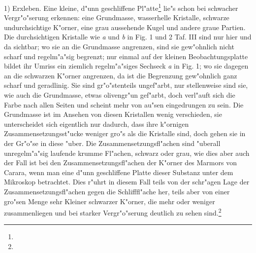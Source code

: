 \documentclass[a4paper, 11pt, oneside]{article}
\begin{document}
1) Erxleben. Eine kleine, d"unn geschliffene Pl"atte\footnote{} lie"s schon bei schwacher Vergr"o"serung erkennen: eine Grundmasse, wasserhelle Kristalle, schwarze undurchsichtige K"orner, eine grau aussehende Kugel und andere graue Partien. Die durchsichtigen Kristalle wie \emph{a} und \emph{b} in Fig. 1 und 2 Taf. III sind nur hier und da sichtbar; wo sie an die Grundmasse angrenzen, sind sie gew"ohnlich nicht scharf und regelm"a"sig begrenzt; nur einmal auf der kleinen Beobachtungsplatte bildet ihr Umriss ein ziemlich regelm"a"siges Sechseck \emph{a} in Fig. 1; wo sie dagegen an die schwarzen K"orner angrenzen, da ist die Begrenzung gew"ohnlich ganz scharf und geradlinig. Sie sind gr"o"stenteils ungef"arbt, nur stellenweise sind sie, wie auch die Grundmasse, etwas olivengr"un gef"arbt, doch verl"auft sich die Farbe nach allen Seiten und scheint mehr von au"sen eingedrungen zu sein. Die Grundmasse ist im Ansehen von diesen Kristallen wenig verschieden, sie unterscheidet sich eigentlich nur dadurch, dass ihre k"ornigen Zusammensetzungsst"ucke weniger gro"s als die Kristalle sind, doch gehen sie in der Gr"o"se in diese "uber. Die Zusammensetzungsfl"achen sind "uberall unregelm"a"sig laufende krumme Fl"achen, schwarz oder grau, wie dies aber auch der Fall ist bei den Zusammensetzungsfl"achen der K"orner des Marmors von Carara, wenn man eine d"unn geschliffene Platte dieser Substanz unter dem Mikroskop betrachtet. Dies r"uhrt in diesem Fall teils von der schr"agen Lage der Zusammensetzungsfl"achen gegen die Schlifffl"ache her, teils aber von einer gro"sen Menge sehr Kleiner schwarzer K"orner, die mehr oder weniger zusammenliegen und bei starker Vergr"o"serung deutlich zu sehen sind.\footnote{}
\end{document}
